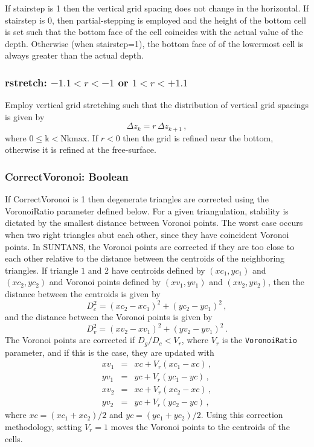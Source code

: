 If stairstep is 1 then the vertical grid spacing does not change in
the horizontal. If stairstep is 0, then partial-stepping is employed and
the height of the bottom cell
is set such that the bottom face of the cell coincides with the actual
value of the depth. Otherwise (when stairstep=1), the bottom face of
of the lowermost cell is always greater than the actual depth.  

\subsubsection{rstretch: $-1.1 < r < -1$ or $1 < r < +1.1$}

Employ vertical grid stretching such that the distribution of vertical
grid spacings is given by
\[
\Delta z_k = r\,\Delta z_{k+1}\,,
\]
where $0\le \mbox{k} < \mbox{Nkmax}$.  If $r<0$ then the grid is refined near the
bottom, otherwise it is refined at the free-surface.

\subsubsection{CorrectVoronoi: Boolean}

If CorrectVoronoi is 1 then degenerate triangles are corrected using
the VoronoiRatio parameter defined below.  For a given triangulation,
stability is dictated by the smallest distance between Voronoi
points.  The worst case occurs when two right triangles abut each
other, since they have coincident Voronoi points.  In SUNTANS, the
Voronoi points are corrected if they are too close to each other
relative to the distance between the centroids of the neighboring triangles.
If triangle $1$ and $2$ have centroids defined by $(xc_1,yc_1)$ and $(xc_2,yc_2)$
and Voronoi points defined by $(xv_1,yv_1)$ and $(xv_2,yv_2)$, then the distance
between the centroids is given by
\[
D_c^2 = (xc_2-xc_1)^2 + (yc_2-yc_1)^2\,,
\]
and the distance between the Voronoi points is given by
\[
D_v^2 = (xv_2-xv_1)^2 + (yv_2-yv_1)^2\,.
\]
The Voronoi points are corrected if $D_g/D_c< V_r$, where $V_r$ is the \verb+VoronoiRatio+ parameter,
and if this is the case, they are updated with
\begin{eqnarray}
xv_1 &=& xc + V_r(xc_1-xc)\,,\nonumber\\
yv_1 &=& yc + V_r(yc_1-yc)\,,\nonumber\\
xv_2 &=& xc + V_r(xc_2-xc)\,,\nonumber\\
yv_2 &=& yc + V_r(yc_2-yc)\,,\nonumber
\end{eqnarray}
where $xc=(xc_1+xc_2)/2$ and $yc=(yc_1+yc_2)/2$.  Using this correction methodology,
setting $V_r=1$ moves the Voronoi points to the centroids of the cells.

